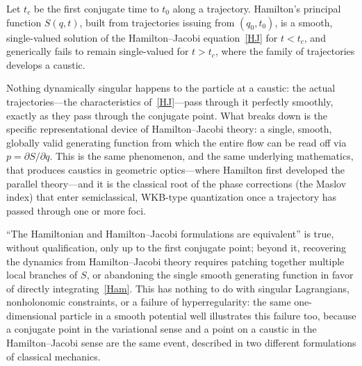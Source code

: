 \begin{proposition}
\label{caustic}
Let $t_c$ be the first conjugate time to $t_0$ along a trajectory.
    Hamilton's principal function $S(q,t)$, built
    from trajectories issuing from $(q_0,t_0)$, is a smooth, single-valued
    solution of the Hamilton--Jacobi equation~\eqref{HJ} for $t<t_c$, and
    generically fails to remain single-valued for $t>t_c$, where the family of
    trajectories develops a caustic.
\end{proposition}

Nothing dynamically singular happens to the particle at a caustic: the actual
trajectories---the characteristics of~\eqref{HJ}---pass through it perfectly
smoothly, exactly as they pass through the conjugate point.
What breaks down is the specific representational
device of Hamilton--Jacobi theory: a single, smooth, globally valid generating
function from which the entire flow can be read off via $p=\partial S/\partial
q$. This is the same phenomenon, and the same underlying mathematics, that
produces caustics in geometric optics---where Hamilton first developed the
parallel theory---and it is the classical root of the phase corrections (the
Maslov index) that enter semiclassical, WKB-type quantization once a trajectory
has passed through one or more foci.

``The Hamiltonian and
Hamilton--Jacobi formulations are equivalent'' is true, without qualification,
only up to the first conjugate point; beyond it, recovering the dynamics from
Hamilton--Jacobi theory requires patching together multiple local branches of
$S$, or abandoning the single smooth generating function in favor of directly
integrating~\eqref{Ham}. This has nothing to do
with singular Lagrangians, nonholonomic constraints, or a failure of
hyperregularity: the same one-dimensional particle in a smooth potential well
illustrates this failure too, because
a conjugate point in the variational sense and a point on a caustic in the
Hamilton--Jacobi sense are the same event, described in two different
formulations of classical mechanics.

